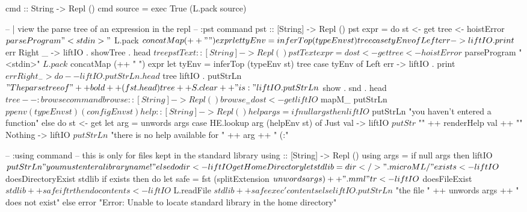 cmd :: String -> Repl ()
cmd source = exec True (L.pack source) 

-- | view the parse tree of an expression in the repl
-- :pst command
pst :: [String] -> Repl ()
pst expr = do
    st <- get
    tree <- hoistError $ parseProgram "<stdin>" $ L.pack $ concatMap (++ " ") expr
    let tyEnv = inferTop (typeEnv st) tree
    case tyEnv of
         Left err -> liftIO . print $ err
         Right _ -> liftIO . showTree . head $ tree

pstText :: [String] -> Repl ()
pstText expr = do
    st <- get
    tree <- hoistError $ parseProgram "<stdin>" $ L.pack $ concatMap (++ " ") expr
    let tyEnv = inferTop (typeEnv st) tree
    case tyEnv of
         Left err -> liftIO . print $ err 
         Right _ -> do  --  liftIO . putStrLn . head $ tree
             liftIO . putStrLn $ "The parsetree of " ++ bold ++ (fst . head) tree ++ S.clear ++ " is: "
             liftIO . putStrLn $ show . snd . head $ tree

-- :browse command
browse :: [String] -> Repl ()
browse _ = do
  st <- get
  liftIO $ mapM_ putStrLn $ ppenv (typeEnv st) (configEnv st)

help :: [String] -> Repl ()
help args = 
    if null args
       then liftIO $ putStrLn "you haven't entered a function"
       else do st <- get
               let arg = unwords args
               case HE.lookup arg (helpEnv st) of
                   Just val -> liftIO $ putStr $ "\n" ++ renderHelp val ++ "\n"
                   Nothing -> liftIO $ putStrLn $ "there is no help available for " ++ arg ++ " (:"

-- :using command
-- this is only for files kept in the standard library
using :: [String] -> Repl ()
using args = 
    if null args 
       then liftIO $ putStrLn "you must enter a library name!"
       else do dir <- liftIO getHomeDirectory
               let stdlib = dir </> ".microML/"
               exists <- liftIO $ doesDirectoryExist stdlib
               if exists
                  then do
                      let safe = fst (splitExtension $ unwords args) ++ ".mml"
                      tr <- liftIO $ doesFileExist $ stdlib ++ safe
                      if tr 
                         then do 
                            contents <- liftIO $ L.readFile $ stdlib ++ safe
                            exec' contents
                         else liftIO . putStrLn $ "the file " ++ unwords args ++ " does not exist"
                  else error "Error: Unable to locate standard library in the home directory"

